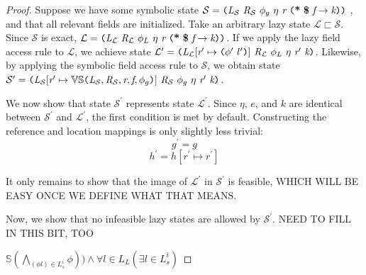 \begin{proof}
Suppose we have some symbolic state  $\mathcal{S} =  \lp \cfgnt{L}_{\mathcal{S}}\ \cfgnt{R}_{\mathcal{S}}\ \phi_g\ \eta\ \cfgnt{r}\ \lp \cfgt{*}\ \cfgt{\$}\ \cfgnt{f} \rightarrow \cfgnt{k}\rp \rp $ , and that all relevant fields are initialized. Take an arbitrary lazy state $\mathcal{L} \sqsubset \mathcal{S}$. Since $\mathcal{S}$ is exact,  $\mathcal{L} = \lp \cfgnt{L}_{\mathcal{L}}\ \cfgnt{R}_{\mathcal{L}}\ \phi_L\ \eta\ \cfgnt{r}\ \lp \cfgt{*}\ \cfgt{\$}\ \cfgnt{f} \rightarrow \cfgnt{k} \rp \rp$. If we apply the lazy field access rule to $\mathcal{L}$, we achieve state $\mathcal{L}^\prime = \lp \cfgnt{L}_{\mathcal{L}} [\cfgnt{r}^\prime \mapsto \lp\phi^\prime\ l^\prime\rp]\ \cfgnt{R}_{\mathcal{L}}\ \phi_L\ \eta\ \cfgnt{r}^\prime\ \cfgnt{k}\rp $. Likewise, by applying the symbolic field access rule to $\mathcal{S}$, we obtain state $\mathcal{S}^\prime = \lp \cfgnt{L}_{\mathcal{S}}[\cfgnt{r}^\prime \mapsto \mathbb{VS}\lp \cfgnt{L}_{\mathcal{S}},\cfgnt{R}_{\mathcal{S}},\cfgnt{r},\cfgnt{f},\phi_g\rp ]\ \cfgnt{R}_{\mathcal{S}}\ \phi_g\ \eta\ \cfgnt{r}^\prime\ \cfgnt{k}\rp $.

We now show that state $\mathcal{S}^\prime$ represents state $\mathcal{L}^\prime $. Since $\eta$, $e$, and $k$ are identical between $\mathcal{S}^\prime$ and $\mathcal{L}^\prime $, the first condition is met by default. Constructing the reference and location mappings is only slightly less trivial: $$g^\prime = g$$ $$h^\prime = h[ r^\prime \mapsto r^\prime]$$ 

It only remains to show that the image of $\mathcal{L}^\prime$ in $\mathcal{S}^\prime$ is feasible, WHICH WILL BE EASY ONCE WE DEFINE WHAT THAT MEANS.

Now, we show that no infeasible lazy states are allowed by $\mathcal{S}^\prime$. NEED TO FILL IN THIS BIT, TOO

$\mathbb{S}(\bigwedge_{(\phi l) \in L_s^i} \phi)) \wedge \forall l \in L_L (\exists l \in L_s^i)$
\end{proof}


